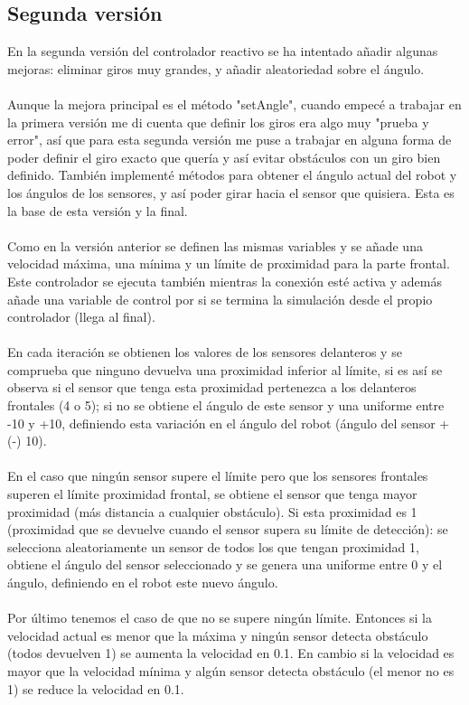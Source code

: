 \documentclass[14pt]{extarticle}
\theoremstyle{definition}
\theoremstyle{remark}
\begin{document}
\subsection{Segunda versión}\label{subsec:segundaversion}
En la segunda versión del controlador reactivo se ha intentado añadir algunas mejoras: eliminar giros muy grandes, y añadir aleatoriedad sobre el ángulo.\\\\
Aunque la mejora principal es el método "setAngle", cuando empecé a trabajar en la primera versión me di cuenta que definir los giros era algo muy "prueba y error", así que para esta segunda versión me puse a trabajar en alguna forma de poder definir el giro exacto que quería y así evitar obstáculos con un giro bien definido. También implementé métodos para obtener el ángulo actual del robot y los ángulos de los sensores, y así poder girar hacia el sensor que quisiera. Esta es la base de esta versión y la final.\\\\
Como en la versión anterior se definen las mismas variables y se añade una velocidad máxima, una mínima y un límite de proximidad para la parte frontal. Este controlador se ejecuta también mientras la conexión esté activa y además añade una variable de control por si se termina la simulación desde el propio controlador (llega al final).\\\\
En cada iteración se obtienen los valores de los sensores delanteros y se comprueba que ninguno devuelva una proximidad inferior al límite, si es así se observa si el sensor que tenga esta proximidad pertenezca a los delanteros frontales (4 o 5); si no se obtiene el ángulo de este sensor y una uniforme entre -10 y +10, definiendo esta variación en el ángulo del robot (ángulo del sensor +(-) 10).\\\\
En el caso que ningún sensor supere el límite pero que los sensores frontales superen el límite proximidad frontal, se obtiene el sensor que tenga mayor proximidad (más distancia a cualquier obstáculo). Si esta proximidad es 1 (proximidad que se devuelve cuando el sensor supera su límite de detección): se selecciona aleatoriamente un sensor de todos los que tengan proximidad 1, obtiene el ángulo del sensor seleccionado y se genera una uniforme entre 0 y el ángulo, definiendo en el robot este nuevo ángulo.\\\\
Por último tenemos el caso de que no se supere ningún límite. Entonces si la velocidad actual es menor que la máxima y ningún sensor detecta obstáculo (todos devuelven 1) se aumenta la velocidad en 0.1. En cambio si la velocidad es mayor que la velocidad mínima y algún sensor detecta obstáculo (el menor no es 1) se reduce la velocidad en 0.1.
\end{document}
